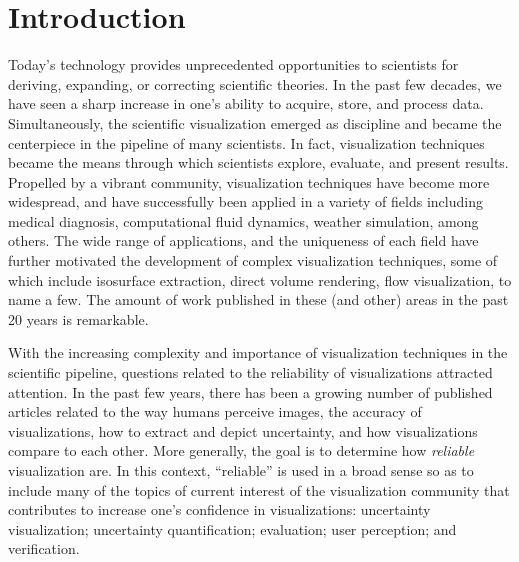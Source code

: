 \chapter{Introduction}

Today's technology provides unprecedented opportunities to scientists for deriving, expanding, or correcting scientific theories. In the past few decades, we have seen a sharp increase in one's ability to acquire, store, and process data. Simultaneously, the scientific visualization emerged as discipline and became the centerpiece in the pipeline of many scientists. In fact, visualization techniques became the means through which scientists explore, evaluate, and present results. 
%
Propelled by a vibrant community, visualization techniques have become more widespread, and have successfully been applied in a variety of fields including medical diagnosis, computational fluid dynamics, weather simulation, among others. The wide range of applications, and the uniqueness of each field have further motivated the development of complex visualization techniques, some of which include isosurface extraction, direct volume rendering, flow visualization, to name a few.  
The amount of work published in these (and other) areas in the past 20 years is remarkable. 

With the increasing complexity and importance of visualization techniques in the scientific pipeline, questions related to the reliability of visualizations attracted attention. In the past few years, there has been a growing number of published  articles related to the way humans perceive images, the accuracy of visualizations, how to extract and depict uncertainty, and how visualizations compare to each other. More generally, the goal is to determine how \emph{reliable} visualization are.
%
In this context, ``reliable'' is used in a broad sense so as to include many of the topics of current interest of the visualization community that contributes to increase one's confidence in visualizations: uncertainty visualization; uncertainty quantification; evaluation; user perception; and verification.

